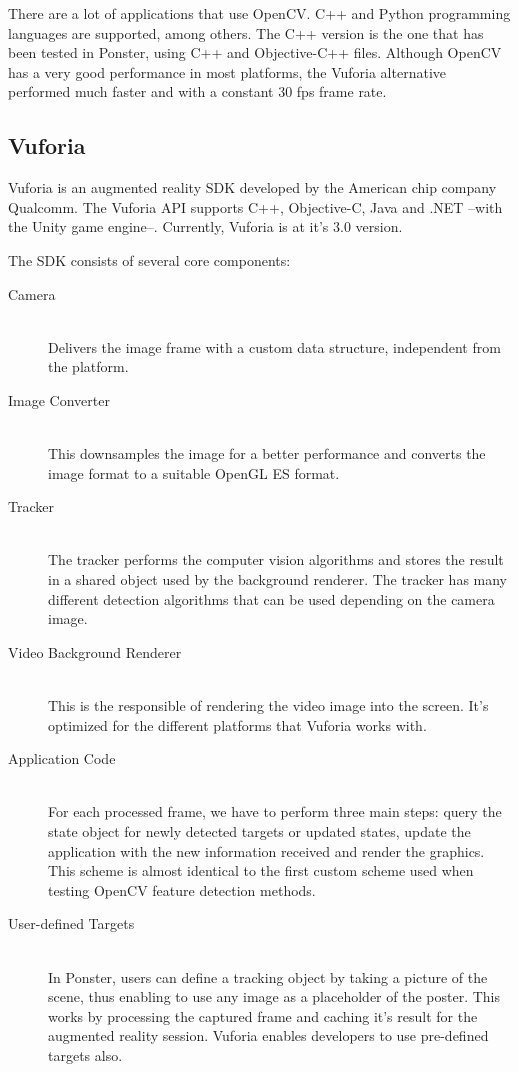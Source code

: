 There are a lot of applications that use OpenCV. C++ and Python programming
languages are supported, among others. The C++ version is the one that has been
tested in Ponster, using C++ and Objective-C++ files. Although OpenCV has a
very good performance in most platforms, the Vuforia alternative performed much
faster and with a constant 30 fps frame rate.

\subsection{Vuforia}
Vuforia is an augmented reality SDK developed by the American chip company
Qualcomm. The Vuforia API supports C++, Objective-C, Java and .NET --with the Unity
game engine--. Currently, Vuforia is at it's 3.0 version. 

The SDK consists of several core components\cite{vuforiasdk01}: 
\begin{description}
\item [Camera] \hfill \\
Delivers the image frame with a custom data structure, independent from the
platform.
\item [Image Converter] \hfill \\
This downsamples the image for a better performance and converts the image format to
a suitable OpenGL ES format.
\item [Tracker] \hfill \\
The tracker performs the computer vision algorithms and stores the result in a
shared object used by the background renderer. The tracker has many different
detection algorithms that can be used depending on the camera image.
\item [Video Background Renderer] \hfill \\
This is the responsible of rendering the video image into the screen. It's optimized
for the different platforms that Vuforia works with.
\item [Application Code] \hfill \\
For each processed frame, we have to perform three main steps: query the state
object for newly detected targets or updated states, update the application with the
new information received and render the graphics. This scheme is almost identical to
the first custom scheme used when testing OpenCV feature detection methods.
\item [User-defined Targets] \hfill \\
In Ponster, users can define a tracking object by taking a picture of the scene,
thus enabling to use any image as a placeholder of the poster. This works by
processing the captured frame and caching it's result for the augmented reality
session. Vuforia enables developers to use pre-defined targets also.
\end{description}

